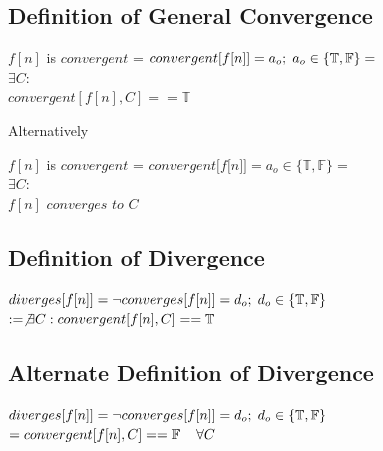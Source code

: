 \documentclass[11pt]{article}
\begin{document}
\subsection{Definition of General Convergence}
\begin{center}
\vspace{1mm}
$f[n]$ is $convergent$ = $convergent \lbrack f \lbrack n \rbrack \rbrack = a_o; \hspace{1mm} a_o \in \{\mathbb{T},\mathbb{F}\} =$
\\ \vspace{6mm}
$
\exists C :
$
\\ \vspace{2mm}
$convergent[f[n],C] == \mathbb{T}$
\end{center}
Alternatively
\begin{center}
\vspace{1mm}
$f[n]$ is $convergent$ = $convergent \lbrack f \lbrack n \rbrack \rbrack = a_o \in \{\mathbb{T},\mathbb{F}\} =$
\\ \vspace{2mm}
$
\exists C :
$
\\ \vspace{2mm}
$f[n]$ $converges$ $to$ $C$
\end{center}

\subsection{Definition of Divergence}
\begin{center}
\vspace{1mm}
$
diverges \lbrack f \lbrack n \rbrack \rbrack = \lnot converges[f[n]] = d_o; \hspace{1mm} d_o \in \{\mathbb{T},\mathbb{F}\}
$
\\ \vspace{4mm}
$
:= \not \exists C : convergent[f[n],C] == \mathbb{T}
$
\end{center}





\subsection{Alternate Definition of Divergence}
\begin{center}
\vspace{1mm}
$diverges \lbrack f \lbrack n \rbrack \rbrack = \lnot converges[f[n]] = d_o; \hspace{1mm} d_o \in \{\mathbb{T},\mathbb{F}\}$
\\ \vspace{4mm}
$
= convergent[f[n],C] == \mathbb{F} \hspace{4mm} \forall C
$
\end{center}
\end{document}
